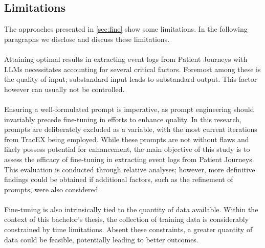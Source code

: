\subsection{Limitations}\label{sec:limitations}
The approaches presented in \autoref{sec:fine} show some limitations. In the following paragraphs we disclose and discuss these limitations.\\\\
Attaining optimal results in extracting event logs from Patient Journeys with LLMs necessitates accounting for several critical factors. Foremost among these is the quality of input; substandard input leads to substandard output. This factor however can usually not be controlled.\\\\
Ensuring a well-formulated prompt is imperative, as prompt engineering should invariably precede fine-tuning in efforts to enhance quality.
In this research, prompts are deliberately excluded as a variable, with the most current iterations from TracEX being employed. While these prompts are not without flaws and likely possess potential for enhancement, the main objective of this study is to assess the efficacy of fine-tuning in extracting event logs from Patient Journeys. This evaluation is conducted through relative analyses; however, more definitive findings could be obtained if additional factors, such as the refinement of prompts, were also considered.\\\\
Fine-tuning is also intrinsically tied to the quantity of data available. Within the context of this bachelor’s thesis, the collection of training data is considerably constrained by time limitations. Absent these constraints, a greater quantity of data could be feasible, potentially leading to better outcomes.\\\\


